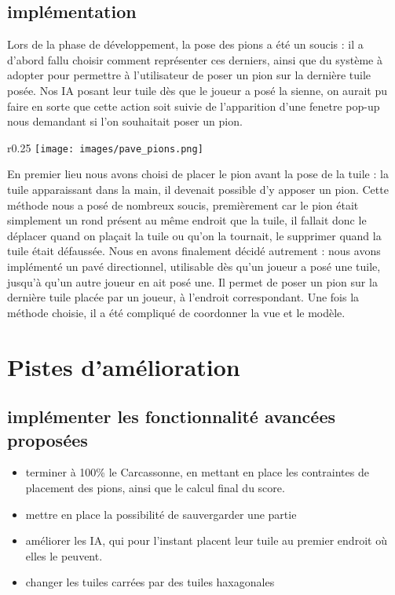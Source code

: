 \documentclass{article}
\begin{document}
\subsection{implémentation}

Lors de la phase de développement, la pose des pions a été un soucis : il a d'abord fallu choisir comment représenter ces derniers, ainsi que du système à adopter pour permettre à l'utilisateur de poser un pion sur la dernière tuile posée. Nos IA posant leur tuile dès que le joueur a posé la sienne, on aurait pu faire en sorte que cette action soit suivie de l'apparition d'une fenetre pop-up nous demandant si l'on souhaitait poser un pion. 

    
\begin{wrapfigure}{r}{0.25\textwidth} 
    \centering
    \texttt{[image: images/pave\_pions.png]}
\end{wrapfigure}

En premier lieu nous avons choisi de placer le pion avant la pose de la tuile : la tuile apparaissant dans la main, il devenait possible d'y apposer un pion. Cette méthode nous a posé de nombreux soucis, premièrement car le pion était simplement un rond présent au même endroit que la tuile, il fallait donc le déplacer quand on plaçait la tuile ou qu'on la tournait, le supprimer quand la tuile était défaussée. Nous en avons finalement décidé autrement : nous avons implémenté un pavé directionnel, utilisable dès qu'un joueur a posé une tuile, jusqu'à qu'un autre joueur en ait posé une. Il permet de poser un pion sur la dernière tuile placée par un joueur, à l'endroit correspondant. Une fois la méthode choisie, il a été compliqué de coordonner la vue et le modèle.




\section{Pistes d'amélioration}

\subsection{implémenter les fonctionnalité avancées proposées}

\begin{itemize}
    \item terminer à 100\% le Carcassonne, en mettant en place les contraintes de placement des pions, ainsi que le calcul final du score.
    \item mettre en place la possibilité de sauvergarder une partie
    \item améliorer les IA, qui pour l'instant placent leur tuile au premier endroit où elles le peuvent. 
    \item changer les tuiles carrées par des tuiles haxagonales

\end{itemize}
\end{document}
